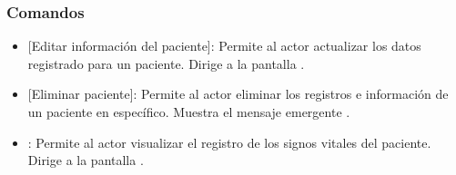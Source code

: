 
\subsubsection{Comandos}
	\begin{itemize}
		\item \btnEditar{} [Editar información del paciente]: Permite al actor actualizar los datos registrado para un paciente. Dirige a la pantalla .
		\item \btnEliminar{} [Eliminar paciente]: Permite al actor eliminar los registros e información de un paciente en específico. Muestra el mensaje emergente .
		\item {}: Permite al actor visualizar el registro de los signos vitales del paciente. Dirige a la pantalla .
	\end{itemize}
\clearpage